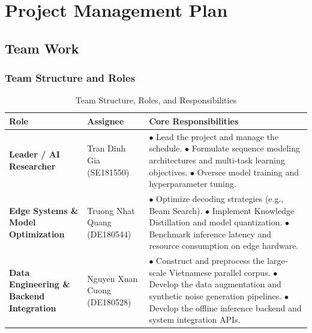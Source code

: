 \chapter{Project Management Plan}\label{chapter:manage}

\section{Team Work}

\subsection{Team Structure and Roles}
\begin{table}[H]
\centering
\small
\renewcommand{\arraystretch}{1.25}
\begin{tabularx}{\textwidth}{|p{3.2cm}|p{3.5cm}|X|}
\hline
\textbf{Role} & \textbf{Assignee} & \textbf{Core Responsibilities} \\
\hline
\textbf{Leader / AI Researcher} & Tran Dinh Gia \newline (SE181550) & 
$\bullet$ Lead the project and manage the schedule. \newline
$\bullet$ Formulate sequence modeling architectures and multi-task learning objectives. \newline
$\bullet$ Oversee model training and hyperparameter tuning. \\
\hline
\textbf{Edge Systems \& Model Optimization} & Truong Nhat Quang \newline (DE180544) & 
$\bullet$ Optimize decoding strategies (e.g., Beam Search). \newline
$\bullet$ Implement Knowledge Distillation and model quantization. \newline
$\bullet$ Benchmark inference latency and resource consumption on edge hardware. \\
\hline
\textbf{Data Engineering \& Backend Integration} & Nguyen Xuan Cuong \newline (DE180528) & 
$\bullet$ Construct and preprocess the large-scale Vietnamese parallel corpus. \newline
$\bullet$ Develop the data augmentation and synthetic noise generation pipelines. \newline
$\bullet$ Develop the offline inference backend and system integration APIs. \\
\hline
\end{tabularx}
\caption{Team Structure, Roles, and Responsibilities}
\label{tab:team_roles}
\end{table}


